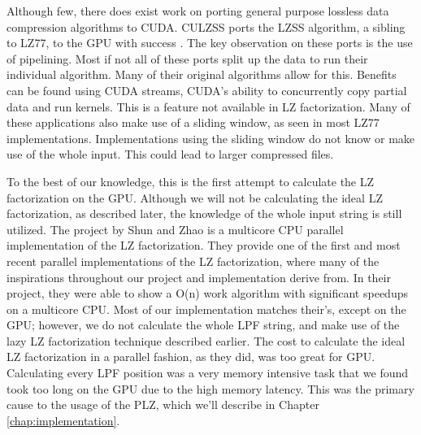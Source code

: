 Although few, there does exist work on porting general purpose lossless data compression algorithms to CUDA.
CULZSS ports the LZSS algorithm, a sibling to LZ77, to the GPU with success \cite{ozsoy2011culzss}.
The key observation on these ports is the use of pipelining.
Most if not all of these ports split up the data to run their individual algorithm.
Many of their original algorithms allow for this.
Benefits can be found using CUDA streams, CUDA's ability to concurrently copy partial data and run kernels.
This is a feature not available in LZ factorization.
Many of these applications also make use of a sliding window, as seen in most LZ77 implementations.
Implementations using the sliding window do not know or make use of the whole input.
This could lead to larger compressed files.


To the best of our knowledge, this is the first attempt to calculate the LZ factorization on the GPU.
Although we will not be calculating the ideal LZ factorization, as described later, the knowledge of the whole input string is still utilized.
The project by Shun and Zhao \cite{shun2013practical} is a multicore CPU parallel implementation of the LZ factorization.
They provide one of the first and most recent parallel implementations of the LZ factorization, where many of the inspirations throughout our project and implementation derive from.
In their project, they were able to show a O(n) work algorithm with significant speedups on a multicore CPU.
Most of our implementation matches their's, except on the GPU; however, we do not calculate the whole LPF string, and make use of the lazy LZ factorization technique described earlier.
The cost to calculate the ideal LZ factorization in a parallel fashion, as they did, was too great for GPU.
Calculating every LPF position was a very memory intensive task that we found took too long on the GPU due to the high memory latency.
This was the primary cause to the usage of the PLZ, which we'll describe in Chapter \ref{chap:implementation}.


